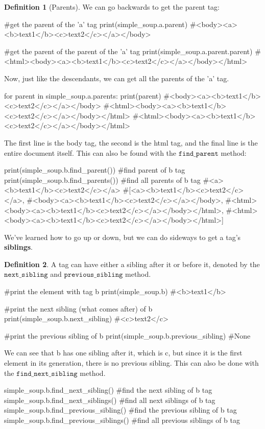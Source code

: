 \documentclass[a4paper, 12pt]{report}
\theoremstyle{remark}
\theoremstyle{definition}
\newtheorem{definition}{Definition}[section]
\begin{document}
\begin{definition}[Parents]
We can go backwards to get the parent tag: 
\begin{python}
#get the parent of the 'a' tag 
print(simple_soup.a.parent)
#<body><a><b>text1</b><c>text2</c></a></body>

#get the parent of the parent of the 'a' tag
print(simple_soup.a.parent.parent)
#<html><body><a><b>text1</b><c>text2</c></a></body></html>
\end{python}
Now, just like the descendants, we can get all the parents of the 'a' tag. 
\begin{python}
for parent in simple_soup.a.parents: 
    print(parent) 
#<body><a><b>text1</b><c>text2</c></a></body>
#<html><body><a><b>text1</b><c>text2</c></a></body></html>
#<html><body><a><b>text1</b><c>text2</c></a></body></html>
\end{python}
The first line is the body tag, the second is the html tag, and the final line is the entire document itself. This can also be found with the $\texttt{find\_parent}$ method: 
\begin{python}
print(simple_soup.b.find_parent())   #find parent of b tag
print(simple_soup.b.find_parents())  #find all parents of b tag
#<a><b>text1</b><c>text2</c></a>
#[<a><b>text1</b><c>text2</c></a>,
#<body><a><b>text1</b><c>text2</c></a></body>,
#<html><body><a><b>text1</b><c>text2</c></a></body></html>,
#<html><body><a><b>text1</b><c>text2</c></a></body></html>]
\end{python}
\end{definition}

We've learned how to go up or down, but we can do sideways to get a tag's \textbf{siblings}. 

\begin{definition}
A tag can have either a sibling after it or before it, denoted by the $\texttt{next\_sibling}$ and $\texttt{previous\_sibling}$ method. 
\begin{python}
#print the element with tag b
print(simple_soup.b)
#<b>text1</b>

#print the next sibling (what comes after) of b
print(simple_soup.b.next_sibling)
#<c>text2</c>

#print the previous sibling of b
print(simple_soup.b.previous_sibling) 
#None
\end{python}
We can see that b has one sibling after it, which is c, but since it is the first element in its generation, there is no previous sibling. This can also be done with the $\texttt{find\_next\_sibling}$ method. 
\begin{python}
simple_soup.b.find_next_sibling()      #find the next sibling of b tag
simple_soup.b.find_next_siblings()     #find all next siblings of b tag 
simple_soup.b.find_previous_sibling()  #find the previous sibling of b tag
simple_soup.b.find_previous_siblings() #find all previous siblings of b tag 
\end{python}
\end{definition}
\end{document}
